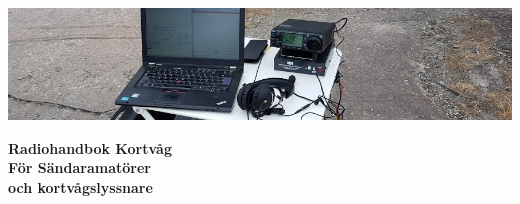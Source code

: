 \newcommand{\TitleText}{Radiohandbok Kortvåg}
\newcommand{\SubtitleText}{För Sändaramatörer\\ och kortvågslyssnare}
\newcommand{\Forfattare}{Täpp-Anders Sikvall}
\newcommand{\Initialer}{SMØUEI}
\newcommand{\DokYear}{19}
\newcommand{\DokVersion}{2.1.1}
\newcommand{\DokumentRevision}{x.y.z}
\newcommand{\DokumentDatum}{\today}


\renewcommand{\arraystretch}{1.15}

\titlefoottrue %



\pagestyle{empty}
\vfill
\vspace*{4cm}
\centerline{\includegraphics[width=\paperwidth]{logo/rubrikbild}}
\begin{flushright}
	\Huge{\bfseries{\TitleText}} \\[3mm]
	\Large{\bfseries{\SubtitleText}}
\end{flushright}

\vfill


